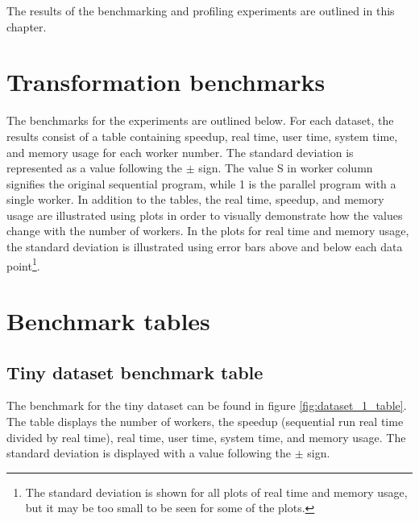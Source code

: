 

The results of the benchmarking and profiling experiments are outlined in this chapter.
\section{Transformation benchmarks}
The benchmarks for the experiments are outlined below. For each dataset, the results consist of a table containing
speedup, real time, user time, system time, and memory usage for each worker number. The standard deviation is represented
as a value following the $\pm$ sign. The value S in worker column signifies the original sequential program, while 1 is the
parallel program with a single worker. In addition to the tables, the real time, speedup, and memory usage are illustrated
using plots in order to visually demonstrate how the values change with the number of workers. In the plots for real time
and memory usage, the standard deviation is illustrated using error bars above and below each data point\footnote{
The standard deviation is shown for all plots of real time and memory usage, but it may be too small to be seen for some of the plots.}.

\section{Benchmark tables}
\subsection{Tiny dataset benchmark table}
The benchmark for the tiny dataset can be found in figure \ref{fig:dataset_1_table}.
The table displays the number of workers, the speedup (sequential run real time divided by real time), real time,
user time, system time, and memory usage. The standard deviation is displayed with a value following the $\pm$ sign.

\begin{table}[ht]
\centering
{}
\caption[Tiny dataset benchmark table.]{Tiny dataset benchmark table. The table displays the number of workers, the speedup (sequential run real time divided by real time), real time,
user time, system time, and memory usage. The standard deviation is displayed with a value following the $\pm$ sign.}
\label{fig:dataset_1_table}
\end{table}

